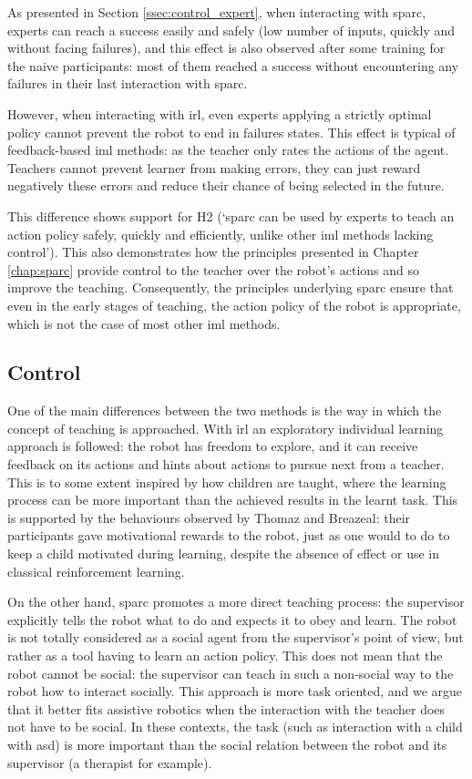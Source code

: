 As presented in Section \ref{ssec:control_expert}, when interacting with \gls{sparc}, experts can reach a success easily and safely (low number of inputs, quickly and without facing failures), and this effect is also observed after some training for the naive participants: most of them reached a success without encountering any failures in their last interaction with \gls{sparc}.

However, when interacting with \gls{irl}, even experts applying a strictly optimal policy cannot prevent the robot to end in failures states. This effect is typical of feedback-based \gls{iml} methods: as the teacher only rates the actions of the agent. Teachers cannot prevent learner from making errors, they can just reward negatively these errors and reduce their chance of being selected in the future.

This difference shows support for H2 (`\gls{sparc} can be used by experts to teach an action policy safely, quickly and efficiently, unlike other \gls{iml} methods lacking control'). This also demonstrates how the principles presented in Chapter \ref{chap:sparc} provide control to the teacher over the robot's actions and so improve the teaching. Consequently, the principles underlying \gls{sparc} ensure that even in the early stages of teaching, the action policy of the robot is appropriate, which is not the case of most other \gls{iml} methods.

\subsection{Control}
\label{sec:control}

One of the main differences between the two methods is the way in which the concept of teaching is approached. With \gls{irl} an exploratory individual learning approach is followed: the robot has freedom to explore, and it can receive feedback on its actions and hints about actions to pursue next from a teacher. This is to some extent inspired by how children are taught, where the learning process can be more important than the achieved results in the learnt task. This is supported by the behaviours observed by Thomaz and Breazeal: their participants gave motivational rewards to the robot, just as one would to do to keep a child motivated during learning, despite the absence of effect or use in classical reinforcement learning.

On the other hand, \gls{sparc} promotes a more direct teaching process: the supervisor explicitly tells the robot what to do and expects it to obey and learn. The robot is not totally considered as a social agent from the supervisor's point of view, but rather as a tool having to learn an action policy. This does not mean that the robot cannot be social: the supervisor can teach in such a non-social way to the robot how to interact socially. This approach is more task oriented, and we argue that it better fits assistive robotics when the interaction with the teacher does not have to be social. In these contexts, the task (such as interaction with a child with \gls{asd}) is more important than the social relation between the robot and its supervisor (a therapist for example).

